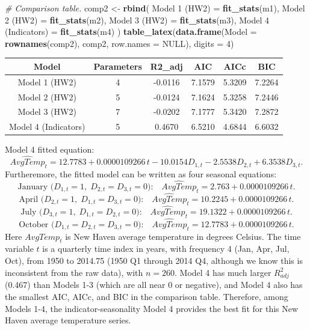 \documentclass[
  10pt,
]{extarticle}
\newenvironment{Shaded}{\begin{snugshade}}{\end{snugshade}}
\newcommand{\AttributeTok}[1]{\textcolor[rgb]{0.13,0.29,0.53}{#1}}
\newcommand{\CommentTok}[1]{\textcolor[rgb]{0.56,0.35,0.01}{\textit{#1}}}
\newcommand{\ConstantTok}[1]{\textcolor[rgb]{0.56,0.35,0.01}{#1}}
\newcommand{\DecValTok}[1]{\textcolor[rgb]{0.00,0.00,0.81}{#1}}
\newcommand{\FunctionTok}[1]{\textcolor[rgb]{0.13,0.29,0.53}{\textbf{#1}}}
\newcommand{\NormalTok}[1]{#1}
\newcommand{\OtherTok}[1]{\textcolor[rgb]{0.56,0.35,0.01}{#1}}
\newcommand{\StringTok}[1]{\textcolor[rgb]{0.31,0.60,0.02}{#1}}
\begin{document}
\begin{Shaded}
\begin{Highlighting}[]
\CommentTok{\# Comparison table.}
\NormalTok{comp2 }\OtherTok{\textless{}{-}} \FunctionTok{rbind}\NormalTok{(}
  \StringTok{\textquotesingle{}Model 1 (HW2)\textquotesingle{}} \OtherTok{=} \FunctionTok{fit\_stats}\NormalTok{(m1),}
  \StringTok{\textquotesingle{}Model 2 (HW2)\textquotesingle{}} \OtherTok{=} \FunctionTok{fit\_stats}\NormalTok{(m2),}
  \StringTok{\textquotesingle{}Model 3 (HW2)\textquotesingle{}} \OtherTok{=} \FunctionTok{fit\_stats}\NormalTok{(m3),}
  \StringTok{\textquotesingle{}Model 4 (Indicators)\textquotesingle{}} \OtherTok{=} \FunctionTok{fit\_stats}\NormalTok{(m4)}
\NormalTok{)}
\FunctionTok{table\_latex}\NormalTok{(}\FunctionTok{data.frame}\NormalTok{(}\AttributeTok{Model =} \FunctionTok{rownames}\NormalTok{(comp2), comp2, }\AttributeTok{row.names =} \ConstantTok{NULL}\NormalTok{), }\AttributeTok{digits =} \DecValTok{4}\NormalTok{)}
\end{Highlighting}
\end{Shaded}

\begin{center}

\begin{tabular}{cccccc}
\toprule
Model & Parameters & R2\_adj & AIC & AICc & BIC\\
\midrule
Model 1 (HW2) & 4 & -0.0116 & 7.1579 & 5.3209 & 7.2264\\
Model 2 (HW2) & 5 & -0.0124 & 7.1624 & 5.3258 & 7.2446\\
Model 3 (HW2) & 7 & -0.0202 & 7.1777 & 5.3420 & 7.2872\\
Model 4 (Indicators) & 5 & 0.4670 & 6.5210 & 4.6844 & 6.6032\\
\bottomrule
\end{tabular}
\end{center}

Model 4 fitted equation:
\[
\widehat{AvgTemp}_t =
12.7783 + 0.0000109266\,t
- 10.0154 D_{1,t}
- 2.5538 D_{2,t}
+ 6.3538 D_{3,t}.
\]
Furtheremore, the fitted model can be written as four seasonal equations:
\[
\text{January (}D_{1,t}=1,\;D_{2,t}=D_{3,t}=0\text{):}\quad
\widehat{AvgTemp}_t = 2.763 + 0.0000109266\,t.
\]
\[
\text{April (}D_{2,t}=1,\;D_{1,t}=D_{3,t}=0\text{):}\quad
\widehat{AvgTemp}_t = 10.2245 + 0.0000109266\,t.
\]
\[
\text{July (}D_{3,t}=1,\;D_{1,t}=D_{2,t}=0\text{):}\quad
\widehat{AvgTemp}_t = 19.1322 + 0.0000109266\,t.
\]
\[
\text{October (}D_{1,t}=D_{2,t}=D_{3,t}=0\text{):}\quad
\widehat{AvgTemp}_t = 12.7783 + 0.0000109266\,t.
\]
Here \(AvgTemp_t\) is New Haven average temperature in degrees Celsius. The time variable \(t\) is a quarterly time index in years, with frequency 4 (Jan, Apr, Jul, Oct), from 1950 to 2014.75 (1950 Q1 through 2014 Q4, although we know this is inconsistent from the raw data), with \(n=260\). Model 4 has much larger \(R^2_{adj}\) (0.467) than Models 1-3 (which are all near 0 or negative), and Model 4 also has the smallest AIC, AICc, and BIC in the comparison table. Therefore, among Models 1-4, the indicator-seasonality Model 4 provides the best fit for this New Haven average temperature series.
\end{document}
